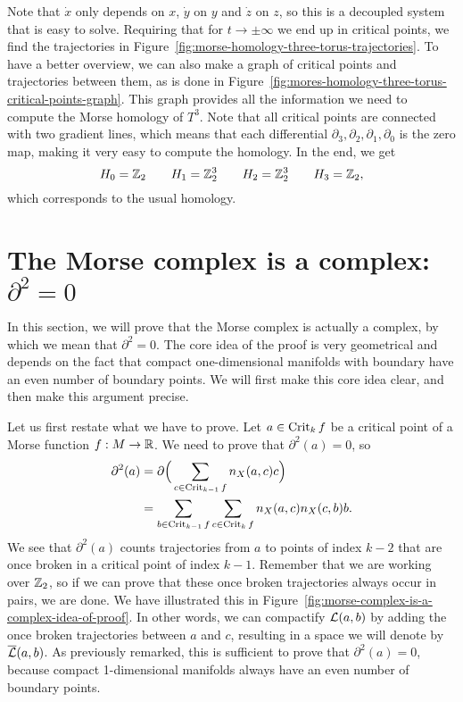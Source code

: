\begin{eg}
    Note that $\dot x$ only depends on  $x$,  $\dot y$ on  $y$ and  $\dot z$ on $z$, so this is a decoupled system that is easy to solve.
    Requiring that for $t \to  \pm\infty$ we end up in critical points, we find the trajectories in Figure~\ref{fig:morse-homology-three-torus-trajectories}.
    To have a better overview, we can also make a graph of critical points and trajectories between them, as is done in Figure~\ref{fig:mores-homology-three-torus-critical-points-graph}.
    This graph provides all the information we need to compute the Morse homology of $T^{3}$.
    Note that all critical points are connected with two gradient lines, which means that each differential $\partial_3, \partial_{2}, \partial_1, \partial_0$ is the zero map, making it very easy to compute the homology. In the end, we get
    \[
    H_0 = \mathbb{Z}_2 \qquad 
    H_1 = \mathbb{Z}_2^3 \qquad 
    H_2 = \mathbb{Z}_2^3 \qquad 
    H_3 = \mathbb{Z}_2
    ,\] 
    which corresponds to the usual homology.
\end{eg}

\section{The Morse complex is a complex: $\partial^2 = 0$}
In this section, we will prove that the Morse complex is actually a complex, by which we mean that $\partial^2 = 0$.
The core idea of the proof is very geometrical and depends on the fact that compact one-dimensional manifolds with boundary have an even number of boundary points.
We will first make this core idea clear, and then make this argument precise.

Let us first restate what we have to prove. Let $a \in \operatorname{Crit}_k f$ be a critical point of a Morse function $f: M \to  \mathbb{R}$.
We need to prove that $\partial^2(a) = 0$, so\begin{align*}
    \partial^2(a) &= \partial \Big(\sum_{c \in \operatorname{Crit}_{k-1} f} n_X(a, c) c\Big)\\
                  &= \sum_{b \in \operatorname{Crit}_{k-1} f} \sum_{c \in \operatorname{Crit}_k f} n_X(a, c) n_X(c, b) b
.\end{align*} 
We see that $\partial^2(a)$ counts trajectories from $a$ to points of index $k-2$ that are once broken in a critical point of index $k-1$.
Remember that we are working over $\mathbb{Z}_2$, so if we can prove that these once broken trajectories always occur in pairs, we are done.
    We have illustrated this in Figure~\ref{fig:morse-complex-is-a-complex-idea-of-proof}.
In other words, we can compactify $\mathcal L(a, b)$ by adding the once broken trajectories between $a$ and $c$, resulting in a space we will denote by $\overline{\mathcal L}(a, b)$.
As previously remarked, this is sufficient to prove that $\partial^2(a) = 0$, because compact 1-dimensional manifolds always have an even number of boundary points.

